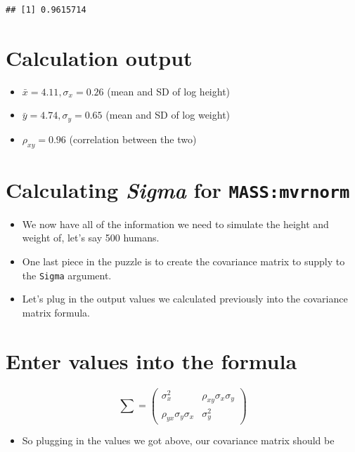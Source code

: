 \documentclass[
]{article}
\providecommand{\tightlist}{%
  \setlength{\itemsep}{0pt}\setlength{\parskip}{0pt}}
\begin{document}
\begin{verbatim}
## [1] 0.9615714
\end{verbatim}

\hypertarget{calculation-output}{%
\section{Calculation output}\label{calculation-output}}

\begin{itemize}
\tightlist
\item
  \(\bar{x} = 4.11, \sigma_x = 0.26\) (mean and SD of log height)
\item
  \(\bar{y} = 4.74, \sigma_y = 0.65\) (mean and SD of log weight)
\item
  \(\rho_{xy} = 0.96\) (correlation between the two)
\end{itemize}

\hypertarget{calculating-sigma-for-massmvrnorm}{%
\section{\texorpdfstring{Calculating \emph{Sigma} for
\texttt{MASS:mvrnorm}}{Calculating Sigma for MASS:mvrnorm}}\label{calculating-sigma-for-massmvrnorm}}

\begin{itemize}
\tightlist
\item
  We now have all of the information we need to simulate the height and
  weight of, let's say 500 humans.
\item
  One last piece in the puzzle is to create the covariance matrix to
  supply to the \texttt{Sigma} argument.
\item
  Let's plug in the output values we calculated previously into the
  covariance matrix formula.
\end{itemize}

\hypertarget{enter-values-into-the-formula}{%
\section{Enter values into the
formula}\label{enter-values-into-the-formula}}

\[
\sum = \begin{pmatrix}\sigma_x^2 & \rho_{xy}\sigma_x\sigma_y \\ \rho_{yx}\sigma_y\sigma_x & \sigma_y^2 \end{pmatrix}
\]

\begin{itemize}
\tightlist
\item
  So plugging in the values we got above, our covariance matrix should
  be
\end{itemize}
\end{document}
